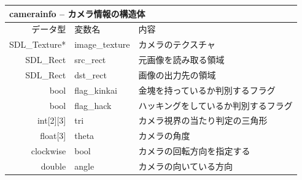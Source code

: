\documentclass{jarticle}
\begin{document}
\begin{table}[H]
\begin{tabular}{|r|l|l|}
\hline
\multicolumn{3}{|l|}{camerainfo -- カメラ情報の構造体}       \\ \hline
データ型      & 変数名    & 内容        \\ \hline
SDL\_Texture* & image\_texture     & カメラのテクスチャ \\
SDL\_Rect & src\_rect & 元画像を読み取る領域 \\
SDL\_Rect & dst\_rect & 画像の出力先の領域 \\
bool & flag\_kinkai& 金塊を持っているか判別するフラグ\\
bool & flag\_hack & ハッキングをしているか判別するフラグ\\
int[2][3] & tri & カメラ視界の当たり判定の三角形\\
float[3] &  theta & カメラの角度 \\
clockwise & bool & カメラの回転方向を指定する\\
double & angle & カメラの向いている方向\\ \hline
\end{tabular}
\end{table}
\end{document}
